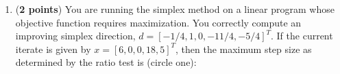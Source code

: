 \documentclass[10pt]{article}
\begin{document}
\begin{enumerate}
\item ({\bf 2 points}) You are running the simplex method on a linear program whose objective function requires maximization.  You correctly compute an improving simplex direction, $d = [-1/4, 1, 0, -11/4, -5/4]^T$.  If the current iterate is given by $x = [6, 0, 0, 18, 5]^T$, then the maximum step size as determined by the ratio test is (circle one):  

\vfill

\end{enumerate}
\end{document}
